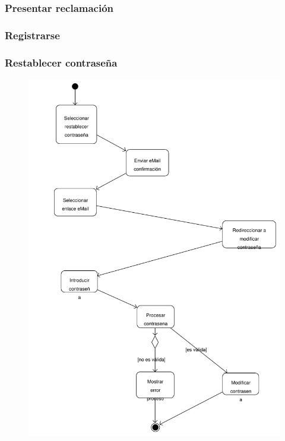 \documentclass[11pt, a4paper, twoside, titlepage]{article}
\begin{document}
			\subsubsection{Presentar reclamación}
				\begin{figure}[H]\centering
				\end{figure}

			\subsubsection{Registrarse}
				\begin{figure}[H]\centering
				\end{figure}

			\subsubsection{Restablecer contraseña}
				\begin{figure}[H]\centering
					\includegraphics[scale=.6]{diagramas/da_restablecercontrasena.pdf}
				\end{figure}
\end{document}
